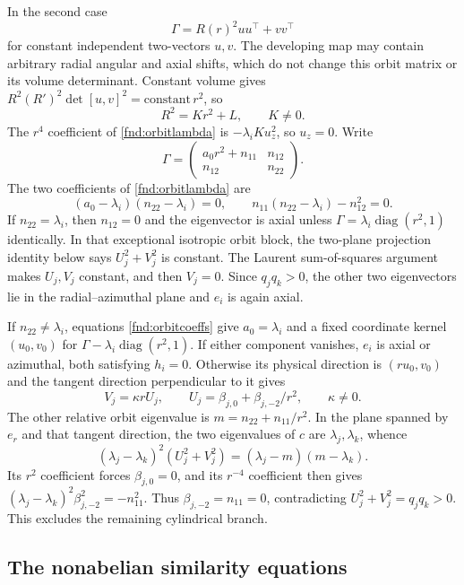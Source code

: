 \documentclass[11pt,a4paper]{article}
\numberwithin{equation}{section}
\theoremstyle{plain}
\theoremstyle{definition}
\theoremstyle{remark}
\begin{document}
In the second case
\[
\Gamma=R(r)^2uu^{\top}+vv^{\top}
\]
for constant independent two-vectors $u,v$. The developing map may contain arbitrary radial angular and axial shifts, which do not change this orbit matrix or its volume determinant. Constant volume gives $R^2(R')^2\det[u,v]^2=\mathrm{constant}\,r^2$, so
\[
R^2=Kr^2+L,\qquad K\ne0.
\]
The $r^4$ coefficient of \eqref{fnd:orbitlambda} is $-\lambda_i Ku_z^2$, so $u_z=0$. Write
\[
\Gamma=\begin{pmatrix}a_0r^2+n_{11}&n_{12}\\n_{12}&n_{22}\end{pmatrix}.
\]
The two coefficients of \eqref{fnd:orbitlambda} are
\begin{equation}\label{fnd:orbitcoeffs}
(a_0-\lambda_i)(n_{22}-\lambda_i)=0,\qquad
n_{11}(n_{22}-\lambda_i)-n_{12}^2=0.
\end{equation}
If $n_{22}=\lambda_i$, then $n_{12}=0$ and the eigenvector is axial unless $\Gamma=\lambda_i\operatorname{diag}(r^2,1)$ identically. In that exceptional isotropic orbit block, the two-plane projection identity below says $U_j^2+V_j^2$ is constant. The Laurent sum-of-squares argument makes $U_j,V_j$ constant, and then $V_j=0$. Since $q_jq_k>0$, the other two eigenvectors lie in the radial--azimuthal plane and $e_i$ is again axial.

If $n_{22}\ne\lambda_i$, equations \eqref{fnd:orbitcoeffs} give $a_0=\lambda_i$ and a fixed coordinate kernel $(u_0,v_0)$ for $\Gamma-\lambda_i\operatorname{diag}(r^2,1)$. If either component vanishes, $e_i$ is axial or azimuthal, both satisfying $h_i=0$. Otherwise its physical direction is $(ru_0,v_0)$ and the tangent direction perpendicular to it gives
\[
V_j=\kappa rU_j,\qquad U_j=\beta_{j,0}+\beta_{j,-2}/r^2,\qquad \kappa\ne0.
\]
The other relative orbit eigenvalue is $m=n_{22}+n_{11}/r^2$. In the plane spanned by $e_r$ and that tangent direction, the two eigenvalues of $c$ are $\lambda_j,\lambda_k$, whence
\begin{equation}\label{fnd:twoplaneidentity}
(\lambda_j-\lambda_k)^2(U_j^2+V_j^2)
=(\lambda_j-m)(m-\lambda_k).
\end{equation}
Its $r^2$ coefficient forces $\beta_{j,0}=0$, and its $r^{-4}$ coefficient then gives $(\lambda_j-\lambda_k)^2\beta_{j,-2}^2=-n_{11}^2$. Thus $\beta_{j,-2}=n_{11}=0$, contradicting $U_j^2+V_j^2=q_jq_k>0$. This excludes the remaining cylindrical branch.

\subsection{The nonabelian similarity equations}\label{appn:nonabelian-proof}
\end{document}
